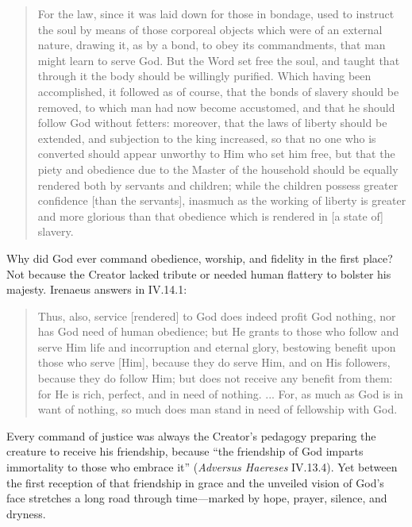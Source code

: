 \begin{quote}
For the law, since it was laid down for those in bondage, used to instruct the soul by means of those corporeal objects which were of an external nature, drawing it, as by a bond, to obey its commandments, that man might learn to serve God. But the Word set free the soul, and taught that through it the body should be willingly purified. Which having been accomplished, it followed as of course, that the bonds of slavery should be removed, to which man had now become accustomed, and that he should follow God without fetters: moreover, that the laws of liberty should be extended, and subjection to the king increased, so that no one who is converted should appear unworthy to Him who set him free, but that the piety and obedience due to the Master of the household should be equally rendered both by servants and children; while the children possess greater confidence [than the servants], inasmuch as the working of liberty is greater and more glorious than that obedience which is rendered in [a state of] slavery.
\end{quote}

Why did God ever command obedience, worship, and fidelity in the first place? Not because the Creator lacked tribute or needed human flattery to bolster his majesty. Irenaeus answers in IV.14.1:

\begin{quote}
Thus, also, service [rendered] to God does indeed profit God nothing, nor has God need of human obedience; but He grants to those who follow and serve Him life and incorruption and eternal glory, bestowing benefit upon those who serve [Him], because they do serve Him, and on His followers, because they do follow Him; but does not receive any benefit from them: for He is rich, perfect, and in need of nothing. ... For, as much as God is in want of nothing, so much does man stand in need of fellowship with God.
\end{quote}

Every command of justice was always the Creator's pedagogy preparing the creature to receive his friendship, because ``the friendship of God imparts immortality to those who embrace it'' (\emph{Adversus Haereses} IV.13.4). Yet between the first reception of that friendship in grace and the unveiled vision of God's face stretches a long road through time---marked by hope, prayer, silence, and dryness.

